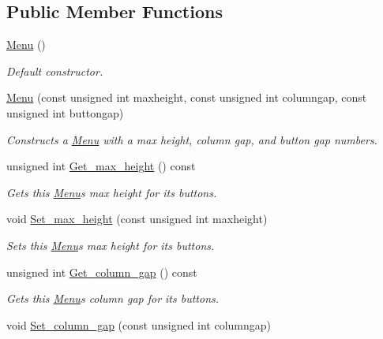\subsection*{Public Member Functions}
\begin{DoxyCompactItemize}
\item 
\hyperlink{classjetfuel_1_1gui_1_1Menu_a8cdd5967a5c57fd28924ac5f9c979398}{Menu} ()
\begin{DoxyCompactList}\small\item\em Default constructor. \end{DoxyCompactList}\item 
\hyperlink{classjetfuel_1_1gui_1_1Menu_ae09bc951a919594033f94c5d827889d1}{Menu} (const unsigned int maxheight, const unsigned int columngap, const unsigned int buttongap)
\begin{DoxyCompactList}\small\item\em Constructs a \hyperlink{classjetfuel_1_1gui_1_1Menu}{Menu} with a max height, column gap, and button gap numbers. \end{DoxyCompactList}\item 
unsigned int \hyperlink{classjetfuel_1_1gui_1_1Menu_a9610775609d7243a9b4ac0c6e57a7aa3}{Get\+\_\+max\+\_\+height} () const
\begin{DoxyCompactList}\small\item\em Gets this \hyperlink{classjetfuel_1_1gui_1_1Menu}{Menu}\textquotesingle{}s max height for it\textquotesingle{}s buttons. \end{DoxyCompactList}\item 
void \hyperlink{classjetfuel_1_1gui_1_1Menu_ad713403a103dc547c7ae968bb6d5e2cd}{Set\+\_\+max\+\_\+height} (const unsigned int maxheight)
\begin{DoxyCompactList}\small\item\em Sets this \hyperlink{classjetfuel_1_1gui_1_1Menu}{Menu}\textquotesingle{}s max height for it\textquotesingle{}s buttons. \end{DoxyCompactList}\item 
unsigned int \hyperlink{classjetfuel_1_1gui_1_1Menu_a52a091ea0c745c1e09752a1766a8f262}{Get\+\_\+column\+\_\+gap} () const
\begin{DoxyCompactList}\small\item\em Gets this \hyperlink{classjetfuel_1_1gui_1_1Menu}{Menu}\textquotesingle{}s column gap for it\textquotesingle{}s buttons. \end{DoxyCompactList}\item 
void \hyperlink{classjetfuel_1_1gui_1_1Menu_a584ce362f2efe836a9cfff9729eac913}{Set\+\_\+column\+\_\+gap} (const unsigned int columngap)

\end{DoxyCompactItemize}
